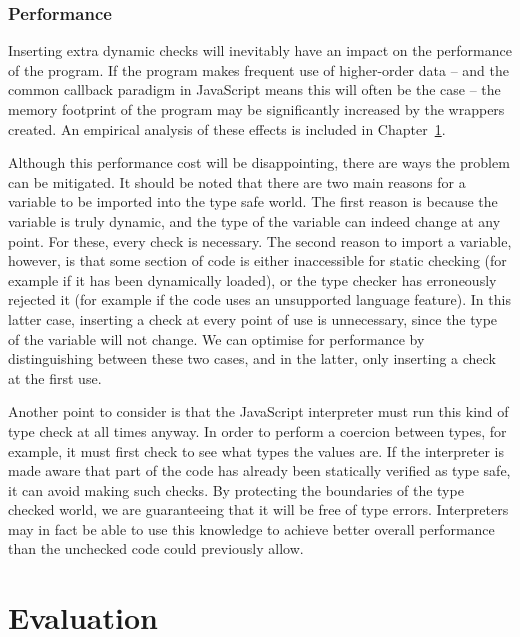 \documentclass[12pt,a4paper,twoside,openright]{report}
\theoremstyle{definition}
\theoremstyle{dotless}
\begin{document}
\subsection{Performance}

Inserting extra dynamic checks will inevitably have an impact on the
performance of the program. If the program makes frequent use of higher-order
data -- and the common callback paradigm in JavaScript means this will often be
the case -- the memory footprint of the program may be significantly increased
by the wrappers created. An empirical analysis of these effects is included in
Chapter~\ref{evaluation}.

Although this performance cost will be disappointing, there are ways the
problem can be mitigated. It should be noted that there are two main reasons
for a variable to be imported into the type safe world. The first reason is
because the variable is truly dynamic, and the type of the variable can indeed
change at any point. For these, every check is necessary. The second reason to
import a variable, however, is that some section of code is either inaccessible
for static checking (for example if it has been dynamically loaded), or the
type checker has erroneously rejected it (for example if the code uses an
unsupported language feature). In this latter case, inserting a check at every
point of use is unnecessary, since the type of the variable will not change. We
can optimise for performance by distinguishing between these two cases, and in
the latter, only inserting a check at the first use.

Another point to consider is that the JavaScript interpreter must run this kind
of type check at all times anyway. In order to perform a coercion between
types, for example, it must first check to see what types the values are. If
the interpreter is made aware that part of the code has already been statically
verified as type safe, it can avoid making such checks. By protecting the
boundaries of the type checked world, we are guaranteeing that it will be free
of type errors. Interpreters may in fact be able to use this knowledge to
achieve better overall performance than the unchecked code could previously
allow.







\chapter{Evaluation}\label{evaluation}
\end{document}
